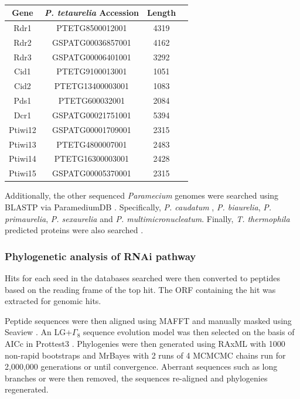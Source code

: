 \begin{table}
    \centering
    \begin{tabular}{|c|c|c|c|}
        \hline
        \textbf{Gene} & \textbf{\textit{P. tetaurelia} Accession} & \textbf{Length} \\
        \hline
        Rdr1 & PTETG8500012001 & 4319 \\ 
        Rdr2 & GSPATG00036857001 & 4162 \\
        Rdr3 & GSPATG00006401001 & 3292 \\
        Cid1 & PTETG9100013001 & 1051 \\
        Cid2 & PTETG13400003001 & 1083 \\
        Pds1 & PTETG600032001 & 2084 \\
        Dcr1 & GSPATG00021751001 & 5394 \\
        Ptiwi12 & GSPATG00001709001 & 2315 \\
        Ptiwi13 & PTETG4800007001 & 2483 \\
        Ptiwi14 & PTETG16300003001 & 2428 \\
        Ptiwi15 & GSPATG00005370001 & 2315 \\
        \hline
    \end{tabular}
    \caption[RNAi pathway components from Marker]{\citep{Marker2014}}
    \label{tab:rnai_seeds}
\end{table}

Additionally, the other sequenced \textit{Paramecium} genomes 
were searched using BLASTP via ParamediumDB \citep{Arnaiz2007,Arnaiz2011a}.
Specifically, \textit{P. caudatum} \citep{McGrath2014}, 
\textit{P. biaurelia}, \textit{P. primaurelia}, \textit{P. sexaurelia}
and \textit{P. multimicronucleatum}. Finally,  \textit{T. thermophila} 
predicted proteins were also searched \citep{Eisen2006}.


\subsubsection{Phylogenetic analysis of RNAi pathway}

Hits for each seed in the databases searched were then converted
to peptides based on the reading frame of the top hit. The ORF containing the
hit was extracted for genomic hits. 

Peptide sequences were then aligned using MAFFT \citep{Katoh2002} and manually
masked using Seaview \citep{Gouy2010}.
An LG+\(\Gamma_8\) sequence evolution model was then selected on the basis
of AICc in Prottest3 \citep{Darriba2011a}.
Phylogenies were then generated using RAxML with 1000 non-rapid bootstraps and MrBayes 
with 2 runs of 4 MCMCMC chains run for 2,000,000 generations or until convergence.
Aberrant sequences such as long branches or were then removed, the sequences
re-aligned and phylogenies regenerated.


